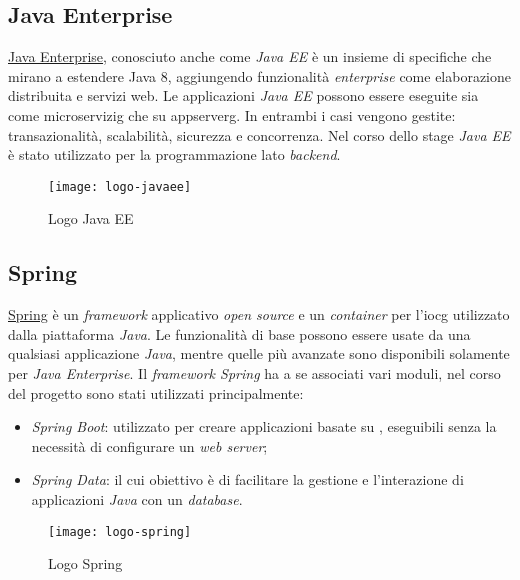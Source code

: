 \subsection{Java Enterprise}
\href{https://www.oracle.com/it/java/technologies/java-ee-glance.html}{Java Enterprise}, conosciuto anche come \textit{Java EE} è un insieme di specifiche che mirano a estendere Java 8, aggiungendo funzionalità \textit{enterprise} come elaborazione distribuita e servizi web. Le applicazioni \textit{Java EE} possono essere eseguite sia come \gls{microservizig}\glsfirstoccur{} che su \gls{appserverg}\glsfirstoccur{}. In entrambi i casi vengono gestite: transazionalità, scalabilità, sicurezza e concorrenza.
Nel corso dello stage \textit{Java EE} è stato utilizzato per la programmazione lato \textit{backend}.
\begin{figure}[h]
    \begin{center}
    \texttt{[image: logo-javaee]}
    \caption{Logo Java EE}
    \label{fig:figure3}
    \end{center}
\end{figure}

\subsection{Spring}
\href{https://spring.io/}{Spring} è un \textit{framework} applicativo \textit{open source} e un \textit{container} per l'\gls{iocg}\glsfirstoccur{} utilizzato dalla piattaforma \textit{Java}. Le funzionalità di base possono essere usate da una qualsiasi applicazione \textit{Java}, mentre quelle più avanzate sono disponibili solamente per \textit{Java Enterprise}.
Il \textit{framework Spring} ha a se associati vari moduli, nel corso del progetto sono stati utilizzati principalmente:
\begin{itemize}
    \item \textit{Spring Boot}: utilizzato per creare applicazioni basate su \textit{}, eseguibili senza la necessità di configurare un \textit{web server};
    \item \textit{Spring Data}: il cui obiettivo è di facilitare la gestione e l'interazione di applicazioni \textit{Java} con un \textit{database}.
\end{itemize}
\begin{figure}[h]
    \begin{center}
    \texttt{[image: logo-spring]}
    \caption{Logo Spring}
    \label{fig:figure4}
    \end{center}
\end{figure}

